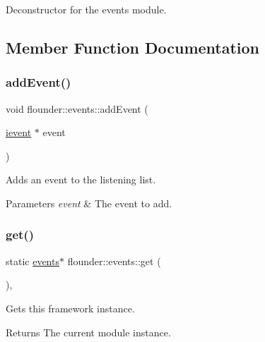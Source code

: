 Deconstructor for the events module. 



\subsection{Member Function Documentation}
\mbox{\label{classflounder_1_1events_a6cb8ff41cf2fbf6a92ca78c122f07eb9}} 
\subsubsection{\texorpdfstring{add\+Event()}{addEvent()}}
{\footnotesize\ttfamily void flounder\+::events\+::add\+Event (\begin{DoxyParamCaption}\item[{\hyperlink{classflounder_1_1ievent}{ievent} $\ast$}]{event }\end{DoxyParamCaption})}



Adds an event to the listening list. 


\begin{DoxyParams}{Parameters}
{\em event} & The event to add. \\
\hline
\end{DoxyParams}
\mbox{\label{classflounder_1_1events_aba09dc039ab9ddb860932a3f8d964f1e}} 
\subsubsection{\texorpdfstring{get()}{get()}}
{\footnotesize\ttfamily static \hyperlink{classflounder_1_1events}{events}$\ast$ flounder\+::events\+::get (\begin{DoxyParamCaption}{ }\end{DoxyParamCaption})\hspace{0.3cm}{\ttfamily [inline]}, {\ttfamily [static]}}



Gets this framework instance. 

\begin{DoxyReturn}{Returns}
The current module instance. 
\end{DoxyReturn}
\mbox{\label{classflounder_1_1events_a3256dce85cd1a62a6126812dab9c4630}} 
